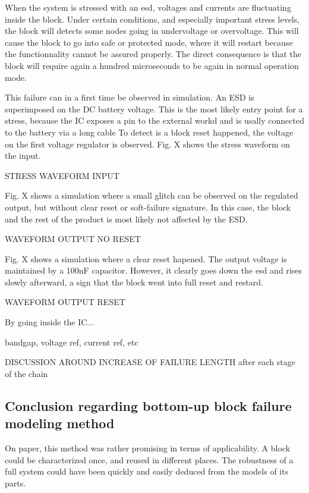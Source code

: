 When the system is stressed with an \gls{esd}, voltages and currents are fluctuating inside the block.
Under certain conditions, and especially important stress levels, the block will detects some nodes going in undervoltage or overvoltage.
This will cause the block to go into safe or protected mode, where it will restart because the functionnality cannot be assured properly.
The direct consequence is that the block will require again a hundred microseconds to be again in normal operation mode.

This failure can in a first time be observed in simulation.
An \gls{ESD} is superimposed on the DC battery voltage.
This is the most likely entry point for a stress, because the \gls{IC} exposes a pin to the external workd and is usally connected to the battery via a long cable
To detect is a block reset happened, the voltage on the first voltage regulator is observed.
Fig. X shows the stress waveform on the input.

STRESS WAVEFORM INPUT

Fig. X shows a simulation where a small glitch can be observed on the regulated output, but without clear reset or soft-failure signature.
In this case, the block and the rest of the product is most likely not affected by the ESD.

WAVEFORM OUTPUT NO RESET

Fig. X shows a simulation where a clear reset hapened.
The output voltage is maintained by a 100nF capacitor.
However, it clearly goes down  the \gls{esd} and rises slowly afterward, a sign that the block went into full reset and restard.

WAVEFORM OUTPUT RESET

By going inside the \gls{IC}...

bandgap, voltage ref, current ref, etc

DISCUSSION AROUND INCREASE OF FAILURE LENGTH after each stage of the chain




\subsection{Conclusion regarding bottom-up block failure modeling method}

On paper, this method was rather promising in terms of applicability.
A block could be characterized once, and reused in different places.
The robustness of a full system could have been quickly and easily deduced from the models of its parts.

